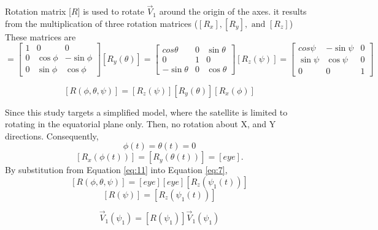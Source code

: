 \documentclass[11pt]{article}
\begin{document}
Rotation matrix [$R$] is used to rotate $\vec{V}_{1}$ around the origin of the axes. it results from the multiplication of three rotation matrices ($[R_x], [R_y], \text{ and } [R_z]$) These matrices are 
\begin{equation}
[R_x(\phi)] = \begin{bmatrix}
            1 &0 & 0 \\
            0 & \cos{\phi}& -\sin{\phi} \\
            0 & \sin{\phi}&\cos{\phi}
            \end{bmatrix}
[R_y(\theta)] = \begin{bmatrix}
            cos{\theta} &0 & \sin{\theta} \\
            0 & 1& 0 \\
            -\sin{\theta}&0 & \cos{\theta}
            \end{bmatrix}
[R_z(\psi)] = \begin{bmatrix}
            cos{\psi}  &  -\sin{\psi}  &  0    \\
            \sin{\psi}&   \cos{\psi}    & 0\\
            0          &    0   & 1          
            \end{bmatrix}        
\end{equation}

\begin{equation}\label{eq:11}
[R(\phi, \theta, \psi)]= [R_z(\psi)][R_y(\theta)][R_x(\phi)]
\end{equation}


Since this study targets a simplified model, where the satellite is limited to rotating in the equatorial plane only. Then, no rotation about X, and Y directions. 
Consequently,
\begin{equation}\label{fig:6}
    \phi(t) = \theta(t) = 0 
    \end{equation}
\begin{equation}\label{eq:7}
    [R_x(\phi(t))]=[R_y(\theta(t))]=[eye] .
\end{equation}
By substitution from Equation \ref{eq:11} into Equation \ref{eq:7},
\begin{equation}\label{eq:04}
    [R(\phi, \theta, \psi)] = [eye] [ eye] [R_z(\psi_1(t))]
\end{equation}
\begin{equation}\label{eq:04}
    [R(\psi)] = [R_z(\psi_1(t))]
\end{equation}

\begin{equation}\label{eq:05}
    \vec{V}_1(\psi_1) = [R(\psi_1)] \vec{V}_1(\psi_1)  
\end{equation}
\end{document}
